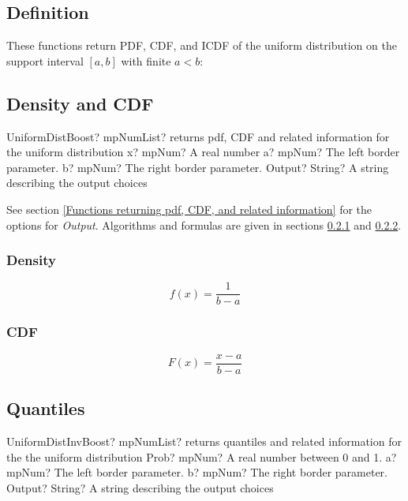 \subsection{Definition}
These functions return PDF, CDF, and ICDF of the uniform distribution on the support
interval $[a, b]$ with finite $a < b$:



\subsection{Density and CDF}
\begin{mpFunctionsExtract}
	\mpFunctionFour
	{UniformDistBoost? mpNumList? returns pdf, CDF and related information for the uniform distribution}
	{x? mpNum? A real number}
	{a? mpNum? The left border parameter.}
	{b? mpNum? The right border parameter.}
	{Output? String? A string describing the output choices}
\end{mpFunctionsExtract}

\vspace{0.3cm}
See section \ref{Functions returning pdf, CDF, and related information} for the options for {\itshape\sffamily Output}. Algorithms and formulas are given in sections \ref{UniformDistributionDensity} and \ref{UniformDistributionCDF}.

\subsubsection{Density}
\label{UniformDistributionDensity}

\begin{equation} 
	f(x)=\frac{1}{b-a}
\end{equation}


\subsubsection{CDF}
\label{UniformDistributionCDF}

\begin{equation} 
	F(x)=\frac{x-a}{b-a}
\end{equation}



\subsection{Quantiles}

\begin{mpFunctionsExtract}
	\mpFunctionFour
	{UniformDistInvBoost? mpNumList? returns quantiles and related information for the the uniform distribution}
	{Prob? mpNum? A real number between 0 and 1.}
	{a? mpNum? The left border parameter.}
	{b? mpNum? The right border parameter.}
	{Output? String? A string describing the output choices}
\end{mpFunctionsExtract}


